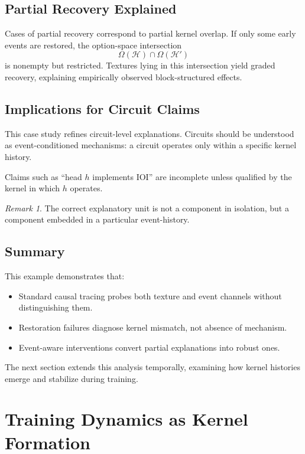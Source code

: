 \documentclass[11pt]{article}
\theoremstyle{remark}
\newtheorem{remark}{Remark}
\newcommand{\Hist}{\mathcal{H}}
\begin{document}
\subsection{Partial Recovery Explained}

Cases of partial recovery correspond to partial kernel overlap. If only
some early events are restored, the option-space intersection
\[
\Omega(\Hist) \cap \Omega(\Hist')
\]
is nonempty but restricted. Textures lying in this intersection yield
graded recovery, explaining empirically observed block-structured
effects.

\subsection{Implications for Circuit Claims}

This case study refines circuit-level explanations. Circuits should be
understood as event-conditioned mechanisms: a circuit operates only
within a specific kernel history.

Claims such as ``head $h$ implements IOI'' are incomplete unless
qualified by the kernel in which $h$ operates.

\begin{remark}
The correct explanatory unit is not a component in isolation, but a
component embedded in a particular event-history.
\end{remark}

\subsection{Summary}

This example demonstrates that:
\begin{itemize}
\item Standard causal tracing probes both texture and event channels
without distinguishing them.
\item Restoration failures diagnose kernel mismatch, not absence of
mechanism.
\item Event-aware interventions convert partial explanations into
robust ones.
\end{itemize}

The next section extends this analysis temporally, examining how kernel
histories emerge and stabilize during training.

\section{Training Dynamics as Kernel Formation}
\end{document}
